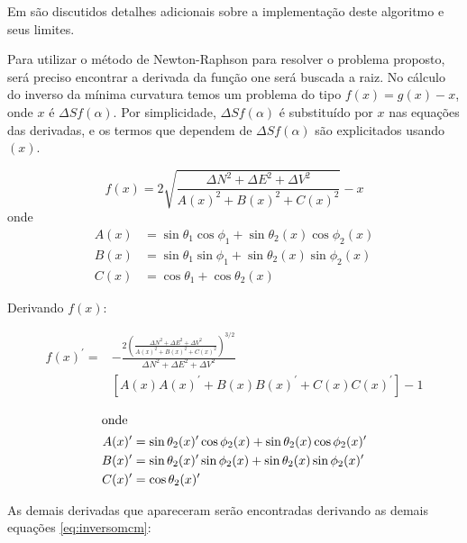 \documentclass[final,5p]{elsarticle}
\numberwithin{equation}{section}
\begin{document}
Em \cite{relatoriobisseccao} são discutidos detalhes adicionais sobre a implementação deste algoritmo e seus limites. 

Para utilizar o método de Newton-Raphson para resolver o problema proposto, será preciso encontrar a derivada da função one será buscada a raiz. No cálculo do inverso da mínima curvatura temos um problema do tipo $f(x) = g(x) - x$, onde $x$ é $\Delta S f(\alpha)$. Por simplicidade, $\Delta S f(\alpha)$ é substituído por $x$ nas equações das derivadas, e os termos que dependem de $\Delta S f(\alpha)$ são explicitados usando $(x)$.

\begin{equation} \label{eq:fx}
    f(x) = 2 \sqrt{\frac{\Delta N^2 + \Delta E^2 + \Delta V^2}{A(x)^2+B(x)^2+C(x)^2}} - x
\end{equation}
onde
\begin{align*}
    A(x) &= \sin \theta_1 \cos \phi_1 + \sin \theta_2(x) \cos \phi_2(x) \\
    B(x) &= \sin \theta_1 \sin \phi_1 + \sin \theta_2(x) \sin \phi_2(x) \\
    C(x) &= \cos \theta_1 + \cos \theta_2(x)
\end{align*}

Derivando $f(x)$:

\begin{align} \label{eq:fxprime}
    f(x)^{\prime} =& - \frac{2\left( \frac{\Delta N^2 + \Delta E^2 + \Delta V^2}{A(x)^2+B(x)^2+C(x)^2} \right) ^{3/2}}{\Delta N^2 + \Delta E^2 + \Delta V^2}  \nonumber \\
    & [A(x)A(x)^{\prime}+B(x)B(x)^{\prime}+C(x)C(x)^{\prime}] - 1
\end{align}

\begin{align*}
    \intertext{onde}
    A(x)^{\prime} &= \sin \theta_2(x)^{\prime} \cos \phi_2(x) + \sin \theta_2(x) \cos \phi_2(x)^{\prime} \\
    B(x)^{\prime} &= \sin \theta_2(x)^{\prime} \sin \phi_2(x) + \sin \theta_2(x) \sin \phi_2(x)^{\prime} \\
    C(x)^{\prime} &= \cos \theta_2(x)^{\prime}
\end{align*}

As demais derivadas que apareceram serão encontradas derivando as demais equações \ref{eq:inversomcm}:
\end{document}
